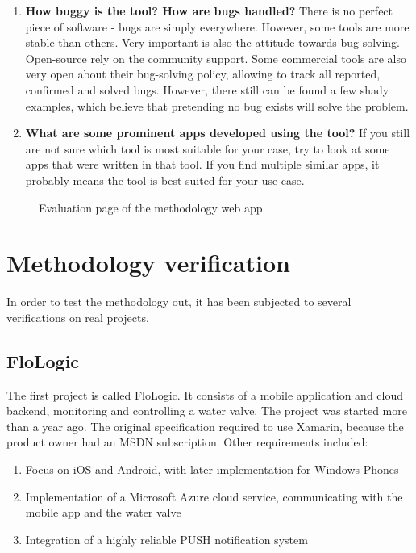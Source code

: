 \documentclass[english,master,public,dept460,male,cpdeclaration,oneside]{diploma}
\begin{document}
\begin{enumerate}
	\item \textbf{How buggy is the tool? How are bugs handled?}
	There is no perfect piece of software - bugs are simply everywhere. However, some tools are more stable than others. Very important is also the attitude towards bug solving. Open-source rely on the community support. Some commercial tools are also very open about their bug-solving policy, allowing to track all reported, confirmed and solved bugs. However, there still can be found a few shady examples, which believe that pretending no bug exists will solve the problem.
	
	\item \textbf{What are some prominent apps developed using the tool?}
	If you still are not sure which tool is most suitable for your case, try to look at some apps that were written in that tool. If you find multiple similar apps, it probably means the tool is best suited for your use case.
\end{enumerate}

\begin{figure}
	\centering{}
	\caption{Evaluation page of the methodology web app}
\end{figure}


\section{Methodology verification}
In order to test the methodology out, it has been subjected to several verifications on real projects. 

\subsection{FloLogic}
The first project is called FloLogic. It consists of a mobile application and cloud backend, monitoring and controlling a water valve. The project was started more than a year ago. The original specification required to use Xamarin, because the product owner had an MSDN subscription. Other requirements included:
\begin{enumerate}
	\item Focus on iOS and Android, with later implementation for Windows Phones
	\item Implementation of a Microsoft Azure cloud service, communicating with the mobile app and the water valve
	\item Integration of a highly reliable PUSH notification system
\end{enumerate}
\end{document}
